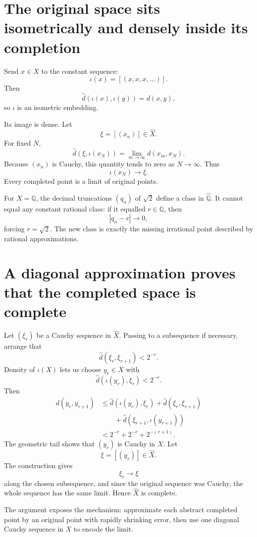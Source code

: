 \section{The original space sits isometrically and densely inside its completion}

Send \(x\in X\) to the constant sequence:
\[
  \iota(x)=[(x,x,x,\ldots)].
\]
Then
\[
  \widehat d(\iota(x),\iota(y))=d(x,y),
\]
so \(\iota\) is an isometric embedding.

Its image is dense.  Let
\[
  \xi=[(x_n)]\in\widehat X.
\]
For fixed \(N\),
\[
  \widehat d(\xi,\iota(x_N))
  =\lim_{m\to\infty}d(x_m,x_N).
\]
Because \((x_n)\) is Cauchy, this quantity tends to zero as \(N\to\infty\).  Thus
\[
  \iota(x_N)\longrightarrow\xi.
\]
Every completed point is a limit of original points.

For \(X=\mathbb Q\), the decimal truncations \((q_n)\) of \(\sqrt2\) define a class in \(\widehat{\mathbb Q}\).  It cannot equal any constant rational class: if it equalled \(r\in\mathbb Q\), then
\[
  |q_n-r|\longrightarrow0,
\]
forcing \(r=\sqrt2\).  The new class is exactly the missing irrational point described by rational approximations.

\section{A diagonal approximation proves that the completed space is complete}

Let \((\xi_r)\) be a Cauchy sequence in \(\widehat X\).  Passing to a subsequence if necessary, arrange that
\[
  \widehat d(\xi_r,\xi_{r+1})<2^{-r}.
\]
Density of \(\iota(X)\) lets us choose \(y_r\in X\) with
\[
  \widehat d(\iota(y_r),\xi_r)<2^{-r}.
\]
Then
\[
\begin{aligned}
  d(y_r,y_{r+1})
  &\le
  \widehat d(\iota(y_r),\xi_r)
  +\widehat d(\xi_r,\xi_{r+1})\\
  &\qquad
  +\widehat d(\xi_{r+1},\iota(y_{r+1}))\\
  &<2^{-r}+2^{-r}+2^{-(r+1)}.
\end{aligned}
\]
The geometric tail shows that \((y_r)\) is Cauchy in \(X\).  Let
\[
  \xi=[(y_r)]\in\widehat X.
\]
The construction gives
\[
  \xi_r\longrightarrow\xi
\]
along the chosen subsequence, and since the original sequence was Cauchy, the whole sequence has the same limit.  Hence \(\widehat X\) is complete.

The argument exposes the mechanism: approximate each abstract completed point by an original point with rapidly shrinking error, then use one diagonal Cauchy sequence in \(X\) to encode the limit.

